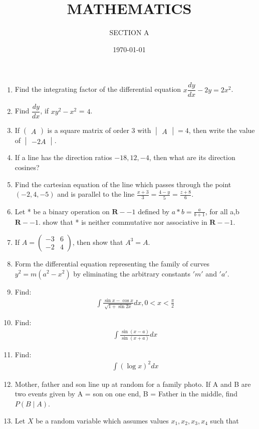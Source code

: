 \documentclass[10pt,-letter paper]{article}
\title{MATHEMATICS}
\author{SECTION A}
\date{\today}
\let\vec\mathbf{}
\let\vec\mathbf{}
\let\vec\mathbf{}
\providecommand{\brak}[1]{\ensuremath{\left(#1\right)}}
\newcommand{\myvec}[1]{\ensuremath{\begin{pmatrix}#1\end{pmatrix}}}
\newcommand{\mydet}[1]{\ensuremath{\begin{vmatrix}#1\end{vmatrix}}}
\begin{document}
\maketitle

\begin{enumerate}
\item Find the integrating factor of the differential equation ${x}\dfrac{dy}{dx}-2{y} = 2{x}^2$.
\item Find $\dfrac{dy}{dx}$, if ${x}{y}^2-{x}^2$ = $4$.
\item If \myvec{A} is a square matrix of order $3$ with $\mydet{A} = 4$, then write the value of $\mydet{-2A}$.
\item If a line has the direction ratios ${-18,12,-4}$, then what are its direction cosines?
\item Find the cartesian equation of the line which passes through the point $\brak{-2,4,-5}$ and is parallel to the line $\frac{{x} + {3}}{3}=\frac{{4} - {y}}{5}=\frac{{z} + {8}}{6}$.
\item Let * be a binary operation on $\vec{R}-{-1}$ defined by $a * b = \frac{a}{{b} + {1}}$, for all a,b \in $\vec{R}-{-1}$. show that * is neither commutative nor associative in $\vec{R}-{-1}$.
\item If $A=\myvec{ -3 & 6 \\ -2 & 4}$, then show that ${A}^3=A$.
\item Form the differential equation representing the family of curves ${y}^2 = m\brak{{a}^2-{x}^2}$ by eliminating the arbitrary constants $'m'$ and $'a'$.
\item Find: 
	\begin{align*}
		\int\frac{\sin x - \cos x}{\sqrt{1+\sin 2x}}dx, 0<x<\frac{\pi}{2}
	\end{align*}
\item Find: 
	\begin{align*}
		\int\frac{\sin\brak{x-a}}{\sin\brak{x+a}}dx
	\end{align*}
\item Find:
	\begin{align*}
	\int\brak{\log{x}}^2dx
        \end{align*}
\item Mother, father and son line up at random for a family photo. If A and B are two events given by A = son on one end, B = Father in the middle, find $P(B\mid A)$.
\item Let ${X}$ be a random variable which assumes values ${x_1},{x_2},{x_3},{x_4}$ such that
	\begin{align*}

\end{align*}
\end{enumerate}
\end{document}
